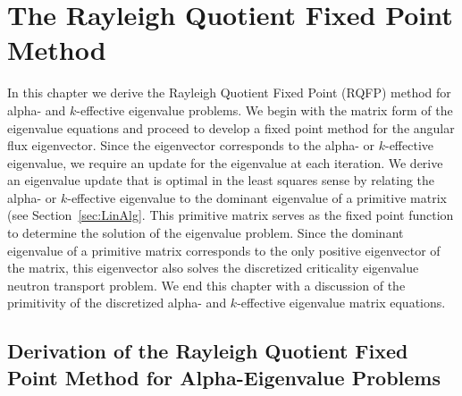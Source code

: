 \chapter{The Rayleigh Quotient Fixed Point Method}
\label{ch3}

In this chapter we derive the Rayleigh Quotient Fixed Point (RQFP) method for alpha- and $k$-effective eigenvalue problems. We begin with the matrix form of the eigenvalue equations and proceed to develop a fixed point method for the angular flux eigenvector. Since the eigenvector corresponds to the alpha- or $k$-effective eigenvalue, we require an update for the eigenvalue at each iteration. We derive an eigenvalue update that is optimal in the least squares sense by relating the alpha- or $k$-effective eigenvalue to the dominant eigenvalue of a primitive matrix (see Section~\ref{sec:LinAlg}. This primitive matrix serves as the fixed point function to determine the solution of the eigenvalue problem. Since the dominant eigenvalue of a primitive matrix corresponds to the only positive eigenvector of the matrix, this eigenvector also solves the discretized criticality eigenvalue neutron transport problem. We end this chapter with a discussion of the primitivity of the discretized alpha- and $k$-effective eigenvalue matrix equations.

\section{Derivation of the Rayleigh Quotient Fixed Point Method for Alpha-Eigenvalue Problems}

